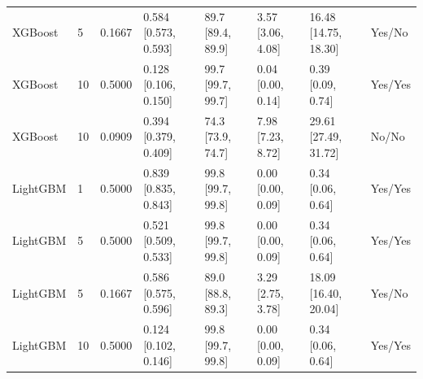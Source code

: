 \begin{longtable}{llllllll}
XGBoost & 5 & 0.1667 & \shortstack{{0.584} \\ {[0.573, 0.593]}} & \shortstack{{89.7} \\ {[89.4, 89.9]}} & \shortstack{{3.57} \\ {[3.06, 4.08]}} & \shortstack{{16.48} \\ {[14.75, 18.30]}} & Yes/No \\
XGBoost & 10 & 0.5000 & \shortstack{{0.128} \\ {[0.106, 0.150]}} & \shortstack{{99.7} \\ {[99.7, 99.7]}} & \shortstack{{0.04} \\ {[0.00, 0.14]}} & \shortstack{{0.39} \\ {[0.09, 0.74]}} & Yes/Yes \\
XGBoost & 10 & 0.0909 & \shortstack{{0.394} \\ {[0.379, 0.409]}} & \shortstack{{74.3} \\ {[73.9, 74.7]}} & \shortstack{{7.98} \\ {[7.23, 8.72]}} & \shortstack{{29.61} \\ {[27.49, 31.72]}} & No/No \\
LightGBM & 1 & 0.5000 & \shortstack{{0.839} \\ {[0.835, 0.843]}} & \shortstack{{99.8} \\ {[99.7, 99.8]}} & \shortstack{{0.00} \\ {[0.00, 0.09]}} & \shortstack{{0.34} \\ {[0.06, 0.64]}} & Yes/Yes \\
LightGBM & 5 & 0.5000 & \shortstack{{0.521} \\ {[0.509, 0.533]}} & \shortstack{{99.8} \\ {[99.7, 99.8]}} & \shortstack{{0.00} \\ {[0.00, 0.09]}} & \shortstack{{0.34} \\ {[0.06, 0.64]}} & Yes/Yes \\
LightGBM & 5 & 0.1667 & \shortstack{{0.586} \\ {[0.575, 0.596]}} & \shortstack{{89.0} \\ {[88.8, 89.3]}} & \shortstack{{3.29} \\ {[2.75, 3.78]}} & \shortstack{{18.09} \\ {[16.40, 20.04]}} & Yes/No \\
LightGBM & 10 & 0.5000 & \shortstack{{0.124} \\ {[0.102, 0.146]}} & \shortstack{{99.8} \\ {[99.7, 99.8]}} & \shortstack{{0.00} \\ {[0.00, 0.09]}} & \shortstack{{0.34} \\ {[0.06, 0.64]}} & Yes/Yes \\

\end{longtable}
